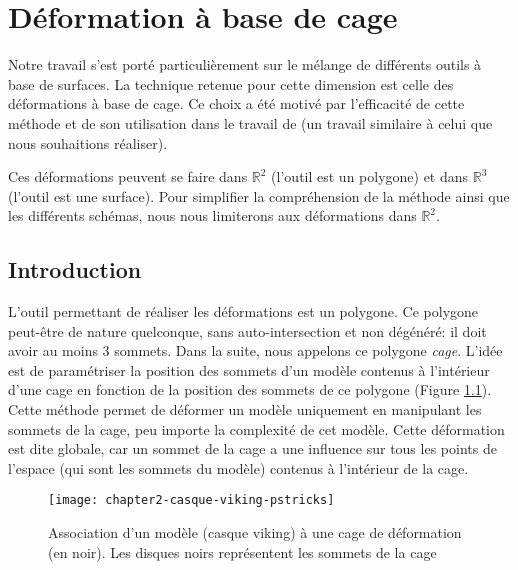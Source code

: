 

\chapter{Déformation à base de cage}

\graphicspath{ {Chapter2/Chapter2Figs/PNG/}
  {Chapter2/Chapter2Figs/PDF/} {Chapter2/Chapter2Figs/} }

Notre travail s'est porté particulièrement sur le mélange de différents outils
à base de surfaces. La technique retenue pour cette dimension est celle
des déformations à base de cage. Ce choix a été motivé par l'efficacité de
cette méthode et de son utilisation dans le travail de \cite{GPCP13} (un
travail similaire à celui que nous souhaitions réaliser).

Ces déformations peuvent se faire dans $\mathbb{R}^2$ (l'outil
est un polygone) et dans $\mathbb{R}^3$ (l'outil est une surface). Pour
simplifier la compréhension de la méthode ainsi que les différents schémas,
nous nous limiterons aux déformations dans $\mathbb{R}^2$.

\section{Introduction} 

L'outil permettant de réaliser les déformations est un polygone. Ce polygone
peut-être de nature quelconque, sans auto-intersection et non dégénéré: il
doit avoir au moins 3 sommets. Dans la suite, nous appelons ce polygone
\textit{cage}. L'idée est de paramétriser la position des sommets d'un modèle
contenus à l'intérieur d'une cage en fonction de la position des sommets de ce
polygone (Figure \ref{DEFMod}). Cette méthode permet de déformer un modèle
uniquement en manipulant les sommets de la cage, peu importe la
complexité de cet modèle. Cette déformation est dite globale, car un sommet de
la cage a une influence sur tous les points de l'espace (qui sont les sommets
du modèle) contenus à l'intérieur de la cage.

\begin{figure}[ht]
\begin{center}
\texttt{[image: chapter2-casque-viking-pstricks]}

\caption[Association d'un modèle à une cage] {Association d'un modèle (casque
viking) à une cage de déformation (en noir). Les disques noirs représentent
les sommets de la cage}

\label{DEFMod}
\end{center}
\end{figure}

